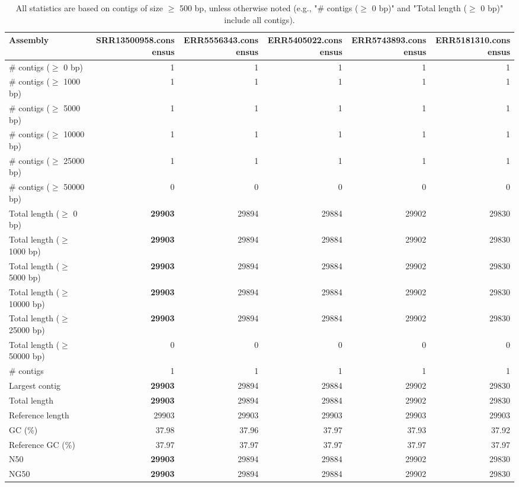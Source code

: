 \documentclass[12pt,a4paper]{article}
\begin{document}
\begin{table}[ht]
\begin{center}
\caption{All statistics are based on contigs of size $\geq$ 500 bp, unless otherwise noted (e.g., "\# contigs ($\geq$ 0 bp)" and "Total length ($\geq$ 0 bp)" include all contigs).}
\begin{tabular}{|l*{5}{|r}|}
\hline
Assembly & SRR13500958.consensus & ERR5556343.consensus & ERR5405022.consensus & ERR5743893.consensus & ERR5181310.consensus \\ \hline
\# contigs ($\geq$ 0 bp) & 1 & 1 & 1 & 1 & 1 \\ \hline
\# contigs ($\geq$ 1000 bp) & 1 & 1 & 1 & 1 & 1 \\ \hline
\# contigs ($\geq$ 5000 bp) & 1 & 1 & 1 & 1 & 1 \\ \hline
\# contigs ($\geq$ 10000 bp) & 1 & 1 & 1 & 1 & 1 \\ \hline
\# contigs ($\geq$ 25000 bp) & 1 & 1 & 1 & 1 & 1 \\ \hline
\# contigs ($\geq$ 50000 bp) & 0 & 0 & 0 & 0 & 0 \\ \hline
Total length ($\geq$ 0 bp) & {\bf 29903} & 29894 & 29884 & 29902 & 29830 \\ \hline
Total length ($\geq$ 1000 bp) & {\bf 29903} & 29894 & 29884 & 29902 & 29830 \\ \hline
Total length ($\geq$ 5000 bp) & {\bf 29903} & 29894 & 29884 & 29902 & 29830 \\ \hline
Total length ($\geq$ 10000 bp) & {\bf 29903} & 29894 & 29884 & 29902 & 29830 \\ \hline
Total length ($\geq$ 25000 bp) & {\bf 29903} & 29894 & 29884 & 29902 & 29830 \\ \hline
Total length ($\geq$ 50000 bp) & 0 & 0 & 0 & 0 & 0 \\ \hline
\# contigs & 1 & 1 & 1 & 1 & 1 \\ \hline
Largest contig & {\bf 29903} & 29894 & 29884 & 29902 & 29830 \\ \hline
Total length & {\bf 29903} & 29894 & 29884 & 29902 & 29830 \\ \hline
Reference length & 29903 & 29903 & 29903 & 29903 & 29903 \\ \hline
GC (\%) & 37.98 & 37.96 & 37.97 & 37.93 & 37.92 \\ \hline
Reference GC (\%) & 37.97 & 37.97 & 37.97 & 37.97 & 37.97 \\ \hline
N50 & {\bf 29903} & 29894 & 29884 & 29902 & 29830 \\ \hline
NG50 & {\bf 29903} & 29894 & 29884 & 29902 & 29830 \\ \hline

\end{tabular}
\end{center}
\end{table}
\end{document}
